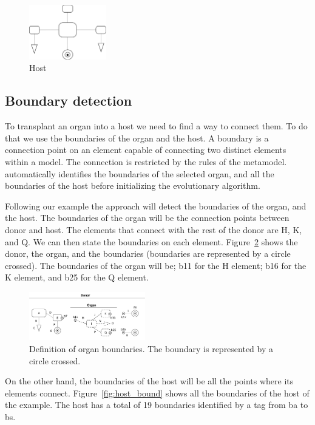 \begin{figure}[h]
    \centering
    \includegraphics[width=0.3\textwidth]{Figures/host.png}
    \caption{Host}
    \label{fig:host}
\end{figure}

\subsection{Boundary detection}

To transplant an organ into a host we need to find a way to connect them. To do that we use the boundaries of the organ and the host. A boundary is a connection point on an element capable of connecting two distinct elements within a model. The connection is restricted by the rules of the metamodel. \ApproachName{} automatically identifies the boundaries of the selected organ, and all the boundaries of the host before initializing the evolutionary algorithm.

Following our example the approach will detect the boundaries of the organ, and the host. The boundaries of the organ will be the connection points between donor and host. The elements that connect with the rest of the donor are H, K, and Q. We can then state the boundaries on each element. Figure~\ref{fig:org_bound} shows the donor, the organ, and the boundaries (boundaries are represented by a circle crossed). The boundaries of the organ will be; b11 for the H element; b16 for the K element, and b25 for the Q element.

\begin{figure}[h]
    \centering
    \includegraphics[width=0.45\textwidth]{Figures/donor+organ_boundaries.png}
    \caption{Definition of organ boundaries. The boundary is represented by a circle crossed.}
    \label{fig:org_bound}
\end{figure}

On the other hand, the boundaries of the host will be all the points where its elements connect. Figure~\ref{fig:host_bound} shows all the boundaries of the host of the example. The host has a total of 19 boundaries identified by a tag from ba to bs.

